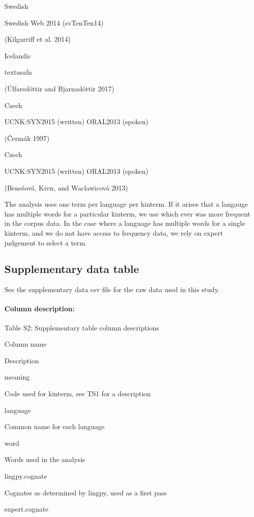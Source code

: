 \documentclass[]{article}
\let\oldparagraph\paragraph
\renewcommand{\paragraph}[1]{\oldparagraph{#1}\mbox{}}
\begin{document}
Swedish

Swedish Web 2014 (svTenTen14)

(Kilgarriff et al. 2014)

Icelandic

textasafn

(Úlfarsdóttir and Bjarnadóttir 2017)

Czech

UCNK:SYN2015 (written) ORAL2013 (spoken)

(Čermák 1997)

Czech

UCNK:SYN2015 (written) ORAL2013 (spoken)

(Benešová, Kren, and Waclawicová 2013)

The analysis uses one term per language per kinterm. If it arises that a
langauge has multiple words for a particular kinterm, we use which ever
was more frequent in the corpus data. In the case where a language has
multiple words for a single kinterm, and we do not have access to
frequency data, we rely on expert judgement to select a term.

\hypertarget{supplementary-data-table}{%
\subsection{Supplementary data table}\label{supplementary-data-table}}

See the supplementary data csv file for the raw data used in this study.

\hypertarget{column-description}{%
\paragraph{Column description:}\label{column-description}}

Table S2: Supplementary table column descriptions

Column name

Description

meaning

Code used for kinterm, see TS1 for a description

language

Common name for each language

word

Words used in the analysis

lingpy.cognate

Cognates as determined by lingpy, used as a first pass

expert.cognate
\end{document}
